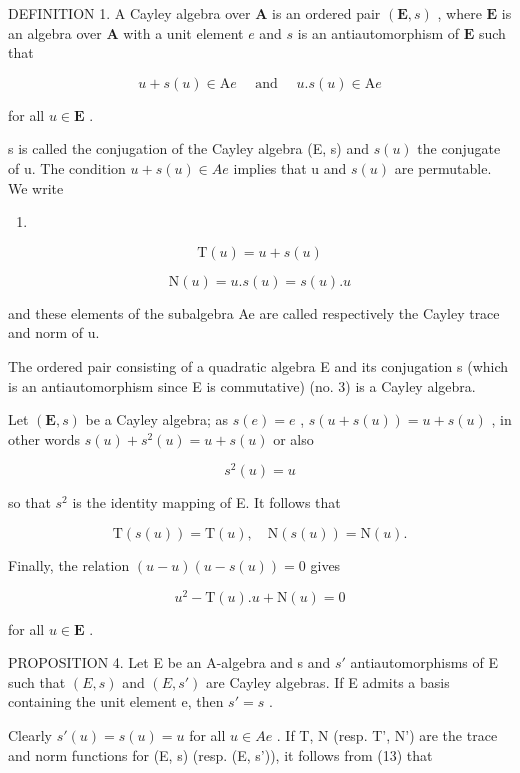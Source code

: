 DEFINITION 1. A Cayley algebra over \(\mathbf{A}\) is an ordered pair \((\mathbf{E}, s)\) , where \(\mathbf{E}\) is an algebra over \(\mathbf{A}\) with a unit element \(e\) and \(s\) is an antiautomorphism of \(\mathbf{E}\) such that

\[
u + s (u) \in \mathrm{A} e \quad \text { and } \quad u. s (u) \in \mathrm{A} e
\]

for all \(u \in \mathbf{E}\) .

s is called the conjugation of the Cayley algebra (E, s) and \(s(u)\) the conjugate of u. The condition \(u + s(u) \in Ae\) implies that u and \(s(u)\) are permutable. We write

\begin{enumerate}
\def\labelenumi{(\arabic{enumi})}
\setcounter{enumi}{8}
\tightlist
\item
\end{enumerate}

\[
\mathrm{T} (u) = u + s (u)\tag{10}
\]

\[
\mathrm{N} (u) = u. s (u) = s (u). u
\]

and these elements of the subalgebra Ae are called respectively the Cayley trace and norm of u.

The ordered pair consisting of a quadratic algebra E and its conjugation s (which is an antiautomorphism since E is commutative) (no. 3) is a Cayley algebra.

Let \((\mathbf{E}, s)\) be a Cayley algebra; as \(s(e) = e\) , \(s(u + s(u)) = u + s(u)\) , in other words \(s(u) + s^2(u) = u + s(u)\) or also

\[
s ^ {2} (u) = u\tag{11}
\]

so that \(s^{2}\) is the identity mapping of E. It follows that

\[
\mathrm{T} (s (u)) = \mathrm{T} (u), \quad \mathrm{N} (s (u)) = \mathrm{N} (u).\tag{12}
\]

Finally, the relation \((u - u)(u - s(u)) = 0\) gives

\[
u ^ {2} - \mathrm{T} (u). u + \mathrm{N} (u) = 0\tag{13}
\]

for all \(u \in \mathbf{E}\) .

PROPOSITION 4. Let E be an A-algebra and s and \(s'\) antiautomorphisms of E such that \((E, s)\) and \((E, s')\) are Cayley algebras. If E admits a basis containing the unit element e, then \(s' = s\) .

Clearly \(s'(u) = s(u) = u\) for all \(u \in Ae\) . If T, N (resp. T', N') are the trace and norm functions for (E, s) (resp. (E, s')), it follows from (13) that

